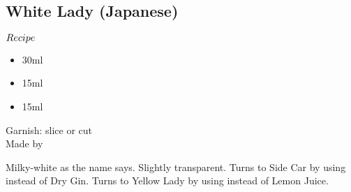 \subsection{White Lady (Japanese)}
\begin{itembox}[l]{\boldmath $Recipe$}
\begin{itemize}
\setlength{\parskip}{0cm}
\setlength{\itemsep}{0cm}
\item \gin 30ml
\item \wc 15ml
\item \lj 15ml
\end{itemize}
\vspace{-4mm}
Garnish: \lemon slice or cut\\
Made by \shake
\end{itembox}
Milky-white as the name says. Slightly transparent.
Turns to Side Car by using \brandy instead of Dry Gin.
Turns to Yellow Lady by using \oj instead of Lemon Juice.
